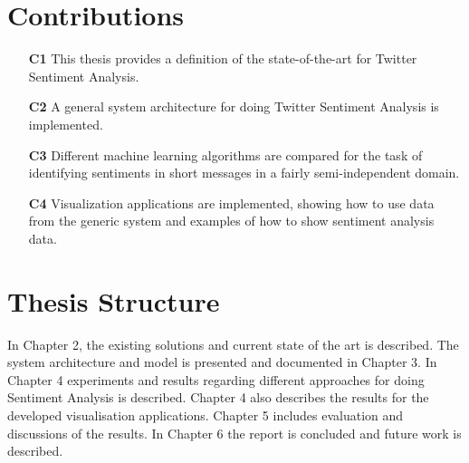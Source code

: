 	

\section{Contributions}
\label{sec:contribution}

\begin{itemize}
\item[\textbf{C1}] This thesis provides a definition of the state-of-the-art for Twitter Sentiment Analysis.

\item[\textbf{C2}] A general system architecture for doing Twitter Sentiment Analysis is implemented. 

\item[\textbf{C3}] Different machine learning algorithms are compared for the task of identifying sentiments in short messages in a fairly semi-independent domain.

\item[\textbf{C4}] Visualization applications are implemented, showing how to use data from the generic system and examples of how to show sentiment analysis data.
 
\end{itemize}

\section{Thesis Structure}
\label{sec:structure}

In Chapter 2, the existing solutions and current state of the art is described. The system architecture and model is presented and documented in Chapter 3. In Chapter 4 experiments and results regarding different approaches for doing Sentiment Analysis is described. Chapter 4 also describes the results for the developed visualisation applications. Chapter 5 includes evaluation and discussions of the results. In Chapter 6 the report is concluded and future work is described. 








